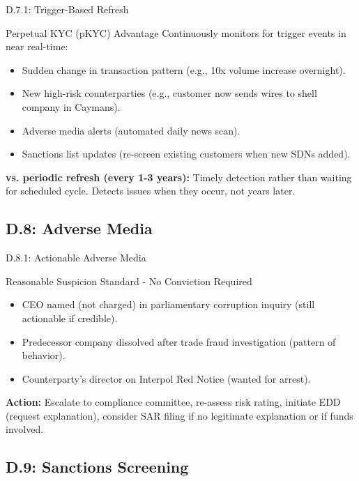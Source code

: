 \documentclass{beamer}
\begin{document}
	\begin{frame}{D.7.1: Trigger-Based Refresh}
		\begin{block}{Perpetual KYC (pKYC) Advantage}
			Continuously monitors for trigger events in near real-time:
			\begin{itemize}
				\item Sudden change in transaction pattern (e.g., 10x volume increase overnight).
				\item New high-risk counterparties (e.g., customer now sends wires to shell company in Caymans).
				\item Adverse media alerts (automated daily news scan).
				\item Sanctions list updates (re-screen existing customers when new SDNs added).
			\end{itemize}
			\textbf{vs. periodic refresh (every 1-3 years):} Timely detection rather than waiting for scheduled cycle. Detects issues when they occur, not years later.
		\end{block}
	\end{frame}
	
	\subsection{D.8: Adverse Media}
	
	\begin{frame}{D.8.1: Actionable Adverse Media}
		\begin{block}{Reasonable Suspicion Standard - No Conviction Required}
			\begin{itemize}
				\item CEO named (not charged) in parliamentary corruption inquiry (still actionable if credible).
				\item Predecessor company dissolved after trade fraud investigation (pattern of behavior).
				\item Counterparty's director on Interpol Red Notice (wanted for arrest).
			\end{itemize}
		\end{block}
		\textbf{Action:} Escalate to compliance committee, re-assess risk rating, initiate EDD (request explanation), consider SAR filing if no legitimate explanation or if funds involved.
	\end{frame}
	
	\subsection{D.9: Sanctions Screening}
	
\end{document}
